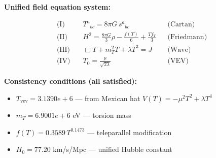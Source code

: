 
\textbf{Unified field equation system:}

\begin{align}
  \text{(I)} \quad & T^a{}_{bc} = 8\pi G \, s^a{}_{bc} && \text{(Cartan)} \\
  \text{(II)} \quad & H^2 = \frac{8\pi G}{3}\rho - \frac{f(T)}{6} + \frac{Tf_T}{3} && \text{(Friedmann)} \\
  \text{(III)} \quad & \Box T + m_T^2 T + \lambda T^3 = J && \text{(Wave)} \\
  \text{(IV)} \quad & T_0 = \frac{\mu}{\sqrt{2\lambda}} && \text{(VEV)}
\end{align}

\textbf{Consistency conditions (all satisfied):}
\begin{itemize}
  \item $T_{\text{vev}} = 3.1390e+6$ — from Mexican hat $V(T) = -\mu^2 T^2 + \lambda T^4$
  \item $m_T = 6.9001e+6$ eV — torsion mass
  \item $f(T) = 0.3589 \, T^{0.1473}$ — teleparallel modification
  \item $H_0 = 77.20$ km/s/Mpc — unified Hubble constant
\end{itemize}